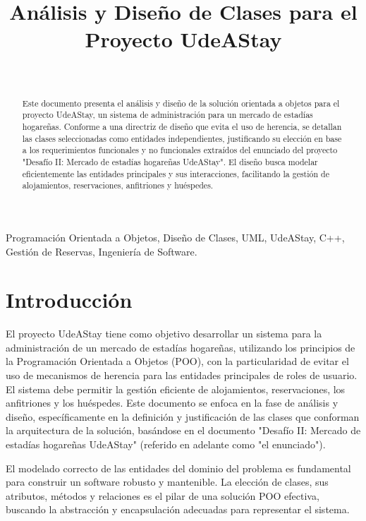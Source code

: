 \documentclass[journal]{IEEEtran}
\title{Análisis y Diseño de Clases para el Proyecto UdeAStay }
\author{
    \IEEEauthorblockN{Daniel Rúa y Tomás Mesa}\\
    \IEEEauthorblockA{\textit{Facultad de Ingeniería} \\
    \textit{Departamento de Ingeniería Electrónica y Telecomunicaciones}\\
    Universidad de Antioquia\\
    Medellín, Colombia }
}
\begin{document}
\maketitle

\begin{abstract} %
Este documento presenta el análisis y diseño de la solución orientada a objetos para el proyecto UdeAStay, un sistema de administración para un mercado de estadías hogareñas. Conforme a una directriz de diseño que evita el uso de herencia, se detallan las clases seleccionadas como entidades independientes, justificando su elección en base a los requerimientos funcionales y no funcionales extraídos del enunciado del proyecto "Desafío II: Mercado de estadías hogareñas UdeAStay". El diseño busca modelar eficientemente las entidades principales y sus interacciones, facilitando la gestión de alojamientos, reservaciones, anfitriones y huéspedes.
\end{abstract}

\begin{IEEEkeywords}
Programación Orientada a Objetos, Diseño de Clases, UML, UdeAStay, C++, Gestión de Reservas, Ingeniería de Software.
\end{IEEEkeywords}

\section{Introducción}
El proyecto UdeAStay tiene como objetivo desarrollar un sistema para la administración de un mercado de estadías hogareñas, utilizando los principios de la Programación Orientada a Objetos (POO), con la particularidad de evitar el uso de mecanismos de herencia para las entidades principales de roles de usuario. El sistema debe permitir la gestión eficiente de alojamientos, reservaciones, los anfitriones y los huéspedes. Este documento se enfoca en la fase de análisis y diseño, específicamente en la definición y justificación de las clases que conforman la arquitectura de la solución, basándose en el documento "Desafío II: Mercado de estadías hogareñas UdeAStay" (referido en adelante como "el enunciado").

El modelado correcto de las entidades del dominio del problema es fundamental para construir un software robusto y mantenible. La elección de clases, sus atributos, métodos y relaciones es el pilar de una solución POO efectiva, buscando la abstracción y encapsulación adecuadas para representar el sistema.
\end{document}
